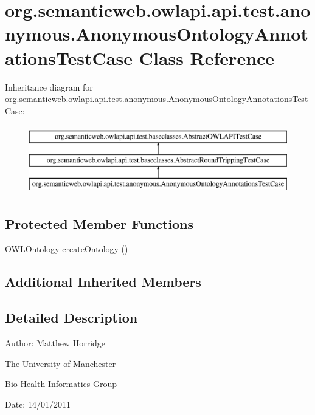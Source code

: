 \hypertarget{classorg_1_1semanticweb_1_1owlapi_1_1api_1_1test_1_1anonymous_1_1_anonymous_ontology_annotations_test_case}{\section{org.\-semanticweb.\-owlapi.\-api.\-test.\-anonymous.\-Anonymous\-Ontology\-Annotations\-Test\-Case Class Reference}
\label{classorg_1_1semanticweb_1_1owlapi_1_1api_1_1test_1_1anonymous_1_1_anonymous_ontology_annotations_test_case}
}
Inheritance diagram for org.\-semanticweb.\-owlapi.\-api.\-test.\-anonymous.\-Anonymous\-Ontology\-Annotations\-Test\-Case\-:\begin{figure}[H]
\begin{center}
\leavevmode
\includegraphics[height=3.000000cm]{classorg_1_1semanticweb_1_1owlapi_1_1api_1_1test_1_1anonymous_1_1_anonymous_ontology_annotations_test_case}
\end{center}
\end{figure}
\subsection*{Protected Member Functions}
\begin{DoxyCompactItemize}
\item 
\hyperlink{interfaceorg_1_1semanticweb_1_1owlapi_1_1model_1_1_o_w_l_ontology}{O\-W\-L\-Ontology} \hyperlink{classorg_1_1semanticweb_1_1owlapi_1_1api_1_1test_1_1anonymous_1_1_anonymous_ontology_annotations_test_case_a56f970fa1da2d2754d70f5f121fb3c75}{create\-Ontology} ()
\end{DoxyCompactItemize}
\subsection*{Additional Inherited Members}


\subsection{Detailed Description}
Author\-: Matthew Horridge\par
 The University of Manchester\par
 Bio-\/\-Health Informatics Group\par
 Date\-: 14/01/2011 

